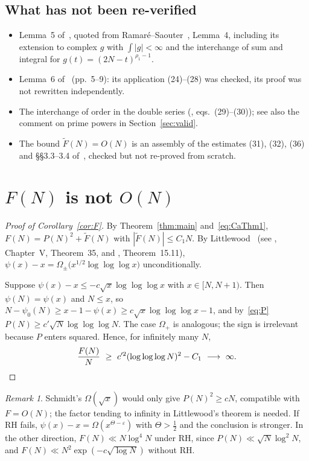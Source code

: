 \documentclass[11pt]{amsart}
\theoremstyle{definition}
\theoremstyle{remark}
\newtheorem{remark}[theorem]{Remark}
\numberwithin{equation}{section}
\newcommand{\Ft}{\widetilde F}
\newcommand{\Ca}{\cite{Ca}}
\begin{document}
\subsection{What has not been re-verified}\label{sec:notverified}
\begin{itemize}
\item Lemma~5 of~\Ca{}, quoted from Ramaré--Saouter~\cite{RS}, Lemma~4, including its
  extension to complex $g$ with $\int|g|<\infty$ and the interchange of sum and integral
  for $g(t)=(2N-t)^{\rho_1-1}$.
\item Lemma~6 of~\Ca{} (pp.~5--9): its application (24)--(28) was checked, its proof was
  not rewritten independently.
\item The interchange of order in the double series (\Ca{}, eqs.~(29)--(30)); see also
  the comment on prime powers in Section~\ref{sec:valid}.
\item The bound $\Ft(N)=O(N)$ is an assembly of the estimates (31), (32), (36) and
  §§3.3--3.4 of~\Ca{}, checked but not re-proved from scratch.
\end{itemize}

\section{\texorpdfstring{$F(N)$ is not $O(N)$}{F(N) is not O(N)}}\label{sec:notON}

\begin{proof}[Proof of Corollary~\ref{cor:F}]
By Theorem~\ref{thm:main} and~\eqref{eq:CaThm1}, $F(N)=P(N)^2+\Ft(N)$ with
$|\Ft(N)|\le C_1N$. By Littlewood~\cite{Li} (see \cite{In}, Chapter~V, Theorem~35, and
\cite{MV}, Theorem~15.11),
$\psi(x)-x=\Omega_\pm\bigl(x^{1/2}\log\log\log x\bigr)$ unconditionally.

Suppose $\psi(x)-x\le -c\sqrt{x}\log\log\log x$ with $x\in[N,N+1)$. Then $\psi(N)=\psi(x)$
and $N\le x$, so $N-\psi_0(N)\ge x-1-\psi(x)\ge c\sqrt x\log\log\log x-1$, and
by~\eqref{eq:P} $P(N)\ge c'\sqrt N\log\log\log N$. The case $\Omega_+$ is analogous; the
sign is irrelevant because $P$ enters squared. Hence, for infinitely many $N$,
\[
  \frac{F(N)}{N}\ \ge\ c'^2(\log\log\log N)^2-C_1\ \longrightarrow\ \infty. \qedhere
\]
\end{proof}

\begin{remark}
Schmidt's $\Omega(\sqrt x)$ would only give $P(N)^2\ge cN$, compatible with
$F=O(N)$; the factor tending to infinity in Littlewood's theorem is needed. If RH fails,
$\psi(x)-x=\Omega(x^{\Theta-\varepsilon})$ with $\Theta>\frac12$ and the conclusion is
stronger. In the other direction, $F(N)\ll N\log^4N$ under RH, since
$P(N)\ll\sqrt N\log^2N$, and $F(N)\ll N^2\exp(-c\sqrt{\log N})$ without RH.
\end{remark}
\end{document}
